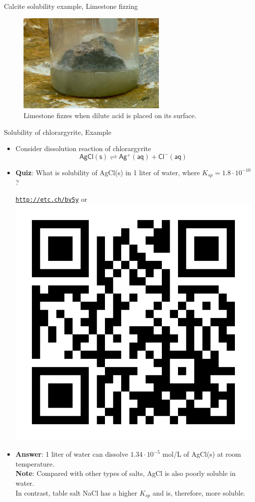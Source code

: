 \begin{frame}{Calcite solubility example,  Limestone fizzing}

\vskip 10pt
\begin{figure}
\centering
\includegraphics[width=0.65\textwidth]{figures/chemical-equilibrium/limestone-fizzing.jpg}
\caption{Limestone fizzes when dilute acid is placed on its surface.}
\end{figure}

\end{frame}
%
%
\begin{frame}{Solubility of chlorargyrite, Example}
	\begin{itemize}
		\item Consider dissolution reaction of chlorargyrite 
		\[
		\mathsf{AgCl(s) \rightleftharpoons Ag^{+}(aq) + Cl^{-}(aq)}
		\]
		\item  \alert{\bf Quiz}: What is solubility of AgCl(s) in 1 liter of water, where $K_{sp} = 1.8 \cdot 10^{-10}$?
		\begin{center}
			\href{http://etc.ch/bv5y}{\textcolor{indigo(dye)}{\tt http://etc.ch/bv5y}} 
			\quad
			or 
			\quad
			\includegraphics[height=0.2\columnwidth]{figures/chemical-equilibrium/poll.png}
		\end{center}
		\hiddenpause
		\item {\bf Answer}: 1 liter of water can dissolve $1.34 \cdot 10^{-5}$ mol/L of AgCl(s) at room temperature. \\
		{\bf Note}: Compared with other types of salts, AgCl is also poorly soluble in water. \\
		In contrast, table salt NaCl has a higher $K_{sp}$ and is, therefore, more soluble.
	\end{itemize}
\end{frame}		
